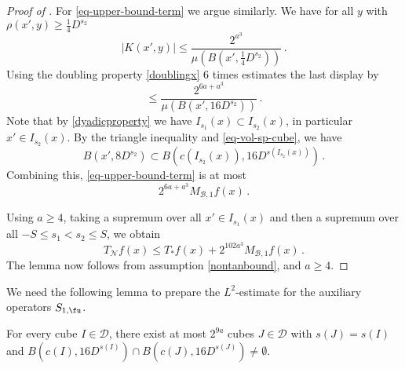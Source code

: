 \begin{proof}[Proof of ]
    For \eqref{eq-upper-bound-term} we argue similarly. We have for all $y$ with $\rho(x', y) \ge \frac{1}{4}D^{s_2}$
    $$
        |K(x', y)| \le \frac{2^{a^3}}{\mu(B(x', \frac{1}{4}D^{s_2}))}\,.
    $$
    Using the doubling property \eqref{doublingx} $6$ times estimates
    the last display by
    \begin{equation}
        \le \frac{2^{6a + a^3}}{\mu(B(x', 16 D^{s_2}))}\, .
    \end{equation}
    Note that by \eqref{dyadicproperty} we have $I_{s_1}(x) \subset I_{s_2}(x)$, in particular $x' \in I_{s_2}(x)$.
    By the triangle inequality and \eqref{eq-vol-sp-cube}, we have
    $$
        B(x', 8D^{s_2}) \subset B(c(I_{s_2}(x)), 16D^{s(I_{s_2}(x))})\,.
    $$
    Combining this, \eqref{eq-upper-bound-term} is at most
    $$
        2^{6a+a^3} M_{\mathcal{B},1} f(x)\,.
    $$

    Using $a \ge 4$, taking a supremum over all $x' \in I_{s_1}(x)$ and then a supremum over all $-S \le s_1 < s_2 \le S$, we obtain
    $$
        T_{\mathcal{N}} f(x) \le T_*f(x) + 2^{102a^3} M_{\mathcal{B},1} f(x)\,.
    $$
    The lemma now follows from assumption \eqref{nontanbound}, and $a \ge 4$.
\end{proof}

We need the following lemma to prepare the $L^2$-estimate for the auxiliary operators $S_{1, \fu}$.

\begin{lemma}
    \label{boundary-overlap}
    For every cube $I \in \mathcal{D}$, there exist at most $2^{9a}$ cubes $J \in \mathcal{D}$ with $s(J) = s(I)$ and $B(c(I), 16D^{s(I)}) \cap B(c(J), 16 D^{s(J)}) \ne \emptyset$.
\end{lemma}

